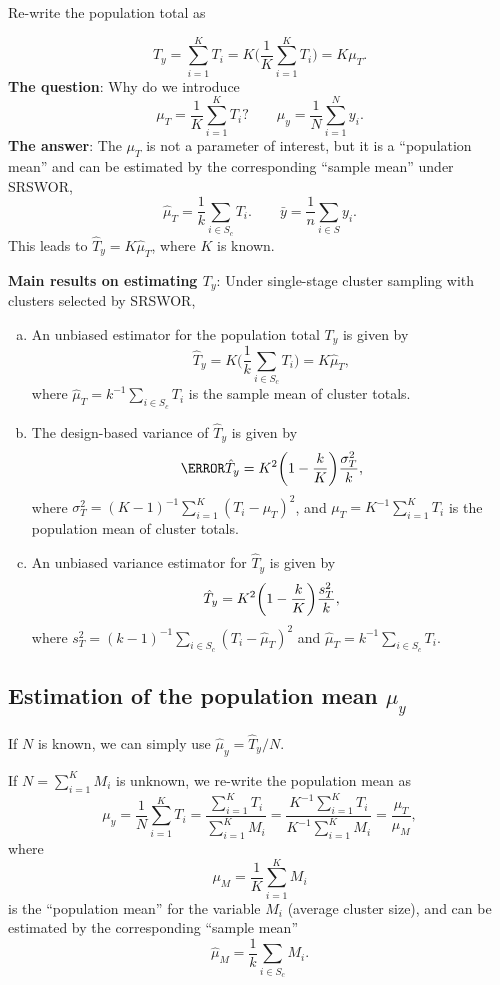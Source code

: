 Re-write the population total as

\[ T_y=\sum_{i=1}^{K}T_i=K\biggl(\frac{1}{K}\sum_{i=1}^{K}T_i\biggr)=K\mu_T. \]
\textbf{The question}: Why do we introduce
\[ \mu_T=\frac{1}{K}\sum_{i=1}^{K}T_i?\qquad \mu_y=\frac{1}{N}\sum_{i=1}^{N}y_i. \]
\textbf{The answer}: The $ \mu_T $ is not a parameter of interest, but it is
a ``population mean'' and can be estimated by the corresponding ``sample mean''
under SRSWOR,
\[ \hat{\mu}_T=\frac{1}{k}\sum_{i\in S_c}T_i.\qquad \bar{y}=\frac{1}{n}\sum_{i\in S}y_i. \]
This leads to $ \hat{T}_y=K\hat{\mu}_T $, where $ K $ is known.

\textbf{Main results on estimating $ T_y $}: Under single-stage cluster sampling
with clusters selected by SRSWOR,
\begin{enumerate}[(a)]
      \item An unbiased estimator for the population total $ T_y $ is given by
            \[ \hat{T}_y=K\biggl(\frac{1}{k}\sum_{i\in S_c}T_i\biggr)=K\hat{\mu}_T, \]
            where $ \hat{\mu}_T=k^{-1}\sum_{i\in S_c}T_i $ is the sample mean of cluster totals.
      \item The design-based variance of $ \hat{T}_y $ is given by
            \[ \V{\hat{T}_y}=K^2\biggl(1-\frac{k}{K}\biggr)\frac{\sigma_T^2}{k}, \]
            where $ \sigma_T^2=(K-1)^{-1}\sum_{i=1}^{K}(T_i-\mu_T)^2 $, and $ \mu_T=K^{-1}\sum_{i=1}^{K}T_i $
            is the population mean of cluster totals.
      \item An unbiased variance estimator for $ \hat{T}_y $ is given by
            \[ \relax{\hat{T}_y}=K^2\biggl(1-\frac{k}{K}\biggr)\frac{s_T^2}{k}, \]
            where $ s_T^2=(k-1)^{-1}\sum_{i\in S_c}(T_i-\hat{\mu}_T)^2 $ and
            $ \hat{\mu}_T=k^{-1}\sum_{i\in S_c}T_i $.
\end{enumerate}

\subsection{Estimation of the population mean \texorpdfstring{$\mu_y$}{μy}}

If $ N $ is known, we can simply use $ \hat{\mu}_y=\hat{T}_y/N $.

If $ N=\sum_{i=1}^{K}M_i $ is unknown, we re-write the population mean as
\[ \mu_y=\frac{1}{N}\sum_{i=1}^{K}T_i=\frac{\sum_{i=1}^{K}T_i}{\sum_{i=1}^{K}M_i}=\frac{K^{-1}\sum_{i=1}^{K}T_i}{K^{-1}\sum_{i=1}^{K}M_i}=\frac{\mu_T}{\mu_M}, \]
where
\[ \mu_M=\frac{1}{K}\sum_{i=1}^{K}M_i \]
is the ``population mean'' for the variable $ M_i $ (average cluster size), and can be
estimated by the corresponding ``sample mean''
\[ \hat{\mu}_M=\frac{1}{k}\sum_{i\in S_c}M_i. \]

